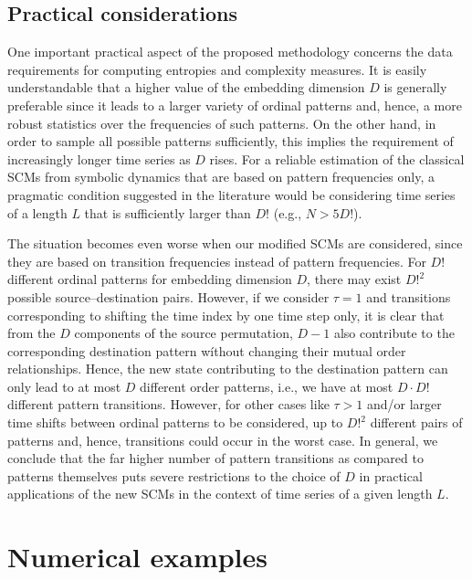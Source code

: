 \documentclass[aip,cha,reprint,nofootinbib]{revtex4-1}
\begin{document}
{\color{red}
\subsection{Practical considerations}\label{sec:tslength}

One important practical aspect of the proposed methodology concerns the data requirements for computing entropies and complexity measures. It is easily understandable that a higher value of the embedding dimension $D$ is generally preferable since it leads to a larger variety of ordinal patterns and, hence, a more robust statistics over the frequencies of such patterns. On the other hand, in order to sample all possible patterns sufficiently, this implies the requirement of increasingly longer time series as $D$ rises. For a reliable estimation of the classical SCMs from symbolic dynamics that are based on pattern frequencies only, a pragmatic condition suggested in the literature would be considering time series of a length $L$ that is sufficiently larger than $D!$ \cite{rossoPRL2007,kowalskiPhyD2007} (e.g., $N>5D!$). 

The situation becomes even worse when our modified SCMs are considered, since they are based on transition frequencies instead of pattern frequencies. For $D!$ different ordinal patterns for embedding dimension $D$, there may exist $D!^2$ possible source--destination pairs. However, if we consider $\tau=1$ and transitions corresponding to shifting the time index by one time step only, it is clear that from the $D$ components of the source permutation, $D-1$ also contribute to the corresponding destination pattern wíthout changing their mutual order relationships. Hence, the new state contributing to the destination pattern can only lead to at most $D$ different order patterns, i.e., we have at most $D\cdot D!$ different pattern transitions. However, for other cases like $\tau>1$ and/or larger time shifts between ordinal patterns to be considered, up to $D!^2$ different pairs of patterns and, hence, transitions could occur in the worst case. In general, we conclude that the  far higher number of pattern transitions as compared to patterns themselves puts severe restrictions to the choice of $D$ in practical applications of the new SCMs in the context of time series of a given length $L$.
}


\section{Numerical examples}\label{sec:results1}
\end{document}
